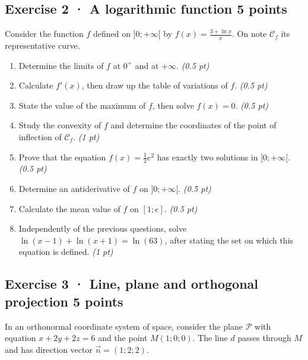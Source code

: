 \subsection*{Exercise 2 · A logarithmic function \hfill 5 points}Consider the function $f$ defined on $]0;+\infty[$ by $f(x)=\frac{3+\ln x}x$. On note $\mathcal C_f$ its representative curve.

\begin{enumerate}

\item Determine the limits of $f$ at $0^+$ and at $+\infty$. \hfill\textit{(0.5 pt)}

\item Calculate $f' (x)$, then draw up the table of variations of $f$. \hfill\textit{(0.5 pt)}

\item State the value of the maximum of $f$, then solve $f(x)=0$. \hfill\textit{(0.5 pt)}

\item Study the convexity of $f$ and determine the coordinates of the point of inflection of $\mathcal C_f$. \hfill\textit{(1 pt)}

\item Prove that the equation $f(x)=\frac12 e^{2}$ has exactly two solutions in $]0;+\infty[$. \hfill\textit{(0.5 pt)}

\item Determine an antiderivative of $f$ on $]0;+\infty[$. \hfill\textit{(0.5 pt)}

\item Calculate the mean value of $f$ on $[1;e]$. \hfill\textit{(0.5 pt)}

\item Independently of the previous questions, solve $\ln(x-1)+\ln(x+1)=\ln(63)$, after stating the set on which this equation is defined. \hfill\textit{(1 pt)}

\end{enumerate}

\clearpage{}\par

\subsection*{Exercise 3 · Line, plane and orthogonal projection \hfill 5 points}In an orthonormal coordinate system of space, consider the plane $\mathcal P$ with equation $x+2y+2z=6$ and the point $M(1;0;0)$. The line $d$ passes through $M$ and has direction vector $\vec n=(1;2;2)$.

